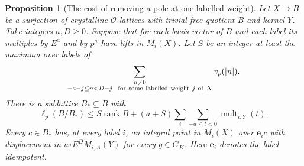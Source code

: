 \documentclass[a4paper,11pt]{article}
\newtheorem{proposition}{Proposition}[section]
\theoremstyle{definition}
\theoremstyle{remark}
\numberwithin{equation}{section}
\begin{document}
\begin{proposition}[The cost of removing a pole at one labelled weight]
\leavevmode\label{prop:rankpole794}
Let \(X\to B\) be a surjection of crystalline \(\mathcal O\)-lattices
with trivial free quotient \(B\) and kernel \(Y\). Take integers
\(a,D\ge0\). Suppose that for each basis vector of \(B\) and each
label its multiples by \(E^a\) and by \(p^a\) have lifts in \(M_i(X)\).
Let \(S\) be an integer at least the maximum over labels of
\[
 \sum_{\substack{n\ne0\\-a-j\le n<D-j\
                       {\rm\ for\ some\ labelled\ weight}\ j\ {\rm of}\ X}}
          v_p(|n|).
\]
There is a sublattice \(B_*\subseteq B\) with
\[
 \ell_p(B/B_*)\le S\operatorname{rank} B+
        (a+S)\sum_i\sum_{-a\le t<0}
                  \operatorname{mult}_{i,Y}(t).
\]
Every \(c\in B_*\) has, at every label \(i\), an integral
point in \(M_i(X)\) over \(\mathbf e_i c\) with displacement in
\(u\tau E^D M_{i,A}(Y)\) for every \(g\in G_K\).
Here \(\mathbf e_i\) denotes the label idempotent.
\end{proposition}
\end{document}
